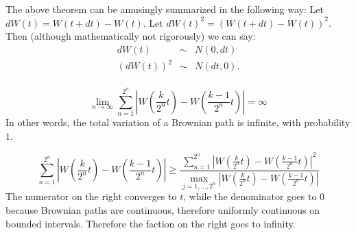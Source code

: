 \begin{problem}
 The above theorem can be amusingly summarized in the following
  way:  Let $dW(t) = W(t + dt) - W(t)$.  Let $dW(t)^2 = ( W(t + dt) -
  W(t) )^2.$  Then (although mathematically not rigorously) we can say:
  \begin{eqnarray*}
     dW(t) &\sim& N(0, dt) \\
     (dW(t))^2 &\sim& N(dt, 0). \\
  \end{eqnarray*}

  \begin{theorem}
  $$
   \lim_{n \to \infty}
            \sum_{n=1}^{2^n} 
              \left|
                 W\left( \frac{k}{2^n} t \right) - 
                 W\left( \frac{k-1}{2^n} t \right)
              \right|
          = \infty
  $$
  In other words, the total variation of a Brownian path is infinite,
  with probability $1$.  
  \end{theorem}

\end{problem} 
\begin{solution} 
$$
    \sum_{n=1}^{2^n} 
      \left| 
         W\left(  \frac{k}{2^n} t \right) - 
         W\left( \frac{k-1}{2^n} t \right)
      \right|
   \ge
   \frac{ 
                 \sum_{n=1}^{2^n} 
      \left| 
         W\left(  \frac{k}{2^n} t \right) - 
         W\left( \frac{k-1}{2^n} t \right)
      \right|^2
       }{
\max_{j=1, \ldots, 2^n} \left| 
         W\left(  \frac{k}{2^n} t \right) - 
         W\left( \frac{k-1}{2^n} t \right)
      \right|
     }
$$
The numerator on the right converges to $t$, while the denominator
goes to $0$ because Brownian paths are continuous, therefore
uniformly continuous on bounded intervals.  Therefore the faction
on the right goes to infinity.
\end{solution}

